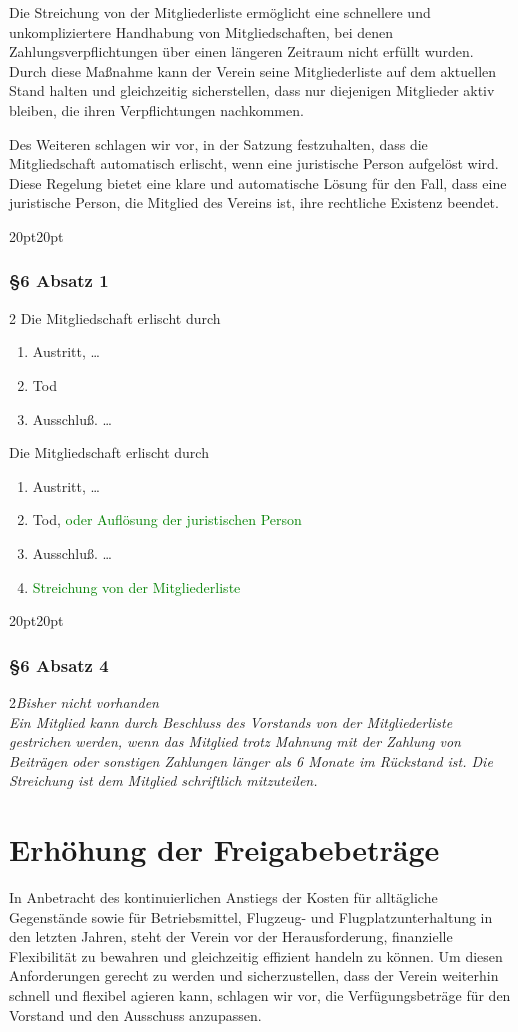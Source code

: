 \documentclass[10pt,a4paper,parskip=half]{scrartcl}
\newcommand{\new}[1]{\textcolor{Green}{#1}}
\newcommand{\change}[1]{
  \begin{adjustwidth}{20pt}{20pt}
    #1
  \end{adjustwidth}
}
\newcommand{\compare}[3]{\change{\subsubsection*{#1}\begin{multicols}{2}#2\columnbreak\\#3\end{multicols}}}
\begin{document}
  Die Streichung von der Mitgliederliste ermöglicht eine schnellere und unkompliziertere Handhabung von Mitgliedschaften, bei denen Zahlungsverpflichtungen über einen längeren Zeitraum nicht erfüllt wurden. Durch diese Maßnahme kann der Verein seine Mitgliederliste auf dem aktuellen Stand halten und gleichzeitig sicherstellen, dass nur diejenigen Mitglieder aktiv bleiben, die ihren Verpflichtungen nachkommen.

  Des Weiteren schlagen wir vor, in der Satzung festzuhalten, dass die Mitgliedschaft automatisch erlischt, wenn eine juristische Person aufgelöst wird. Diese Regelung bietet eine klare und automatische Lösung für den Fall, dass eine juristische Person, die Mitglied des Vereins ist, ihre rechtliche Existenz beendet.

  \change{
  \subsubsection*{§6 Absatz 1}
  \begin{multicols}{2}
  Die Mitgliedschaft erlischt durch
  \begin{enumerate}[label=\alph*)]
    \item Austritt, \dots
    \item Tod
    \item{Ausschluß.} \dots
  \end{enumerate}
  \columnbreak
  Die Mitgliedschaft erlischt durch
  \begin{enumerate}[label=\alph*)]
    \item Austritt, \dots
    \item Tod, \new{oder Auflösung der juristischen Person}
    \item{Ausschluß.} \dots
    \item \new{Streichung von der Mitgliederliste}
  \end{enumerate}
\end{multicols}
  }
\compare{§6 Absatz 4}{\em Bisher nicht vorhanden \em}{Ein Mitglied kann durch Beschluss des Vorstands von der Mitgliederliste gestrichen werden,
wenn das Mitglied trotz Mahnung mit der Zahlung von Beiträgen oder sonstigen Zahlungen länger als 6 Monate im Rückstand ist.
Die Streichung ist dem Mitglied schriftlich mitzuteilen.}

\clearpage
  \section{Erhöhung der Freigabebeträge}
  In Anbetracht des kontinuierlichen Anstiegs der Kosten für alltägliche Gegenstände sowie für Betriebsmittel, Flugzeug- und Flugplatzunterhaltung in den letzten Jahren, steht der Verein vor der Herausforderung, finanzielle Flexibilität zu bewahren und gleichzeitig effizient handeln zu können. Um diesen Anforderungen gerecht zu werden und sicherzustellen, dass der Verein weiterhin schnell und flexibel agieren kann, schlagen wir vor, die Verfügungsbeträge für den Vorstand und den Ausschuss anzupassen.
\end{document}
